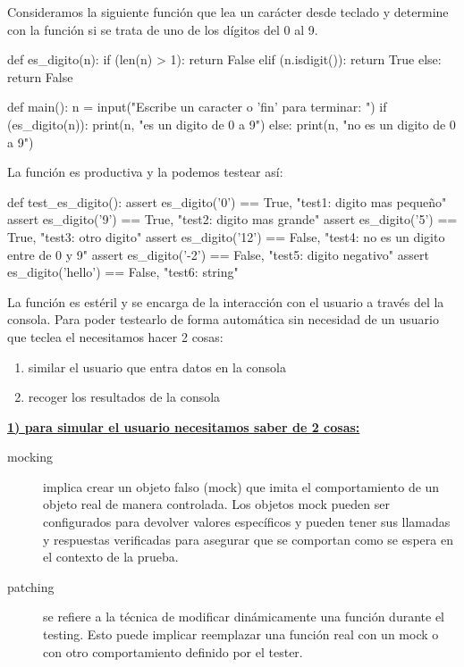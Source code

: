 Consideramos la siguiente función  que lea un carácter desde teclado y determine con la función  si se trata de uno de los dígitos del 0 al 9. 

\begin{python}
def es_digito(n):
    if (len(n) > 1):
        return False
    elif (n.isdigit()):
        return True
    else:
        return False

def main():
    n = input("Escribe un caracter o 'fin' para terminar: ")
    if (es_digito(n)):
        print(n, "es un digito de 0 a 9")
    else:
        print(n, "no es un digito de 0 a 9")
\end{python}

La función  es productiva y la podemos testear así:

\begin{python}
def test_es_digito():
    assert es_digito('0') ==  True,   "test1: digito mas pequeño"
    assert es_digito('9') ==  True,   "test2: digito mas grande"
    assert es_digito('5') ==  True,   "test3: otro digito"
    assert es_digito('12') ==  False, "test4: no es un digito entre de 0 y 9"
    assert es_digito('-2') ==  False, "test5: digito negativo"
    assert es_digito('hello') ==  False, "test6: string"
\end{python}

La función  es estéril y se encarga de la interacción con el usuario a través del la consola. Para poder testearlo de forma automática sin necesidad de un usuario que teclea el  necesitamos hacer 2 cosas:

\begin{enumerate}
\item similar el usuario que entra datos en la consola
\item recoger los resultados de la consola
\end{enumerate}

\underline{\textbf{1) para simular el usuario necesitamos saber de 2 cosas:}}

\begin{description}
\item[mocking] implica crear un objeto falso (mock) que imita el comportamiento de un objeto real de manera controlada. Los objetos mock pueden ser configurados para devolver valores específicos y pueden tener sus llamadas y respuestas verificadas para asegurar que se comportan como se espera en el contexto de la prueba.

\item[patching] se refiere a la técnica de modificar dinámicamente una función durante el testing. Esto puede implicar reemplazar una función real con un mock o con otro comportamiento definido por el tester.
\end{description}

